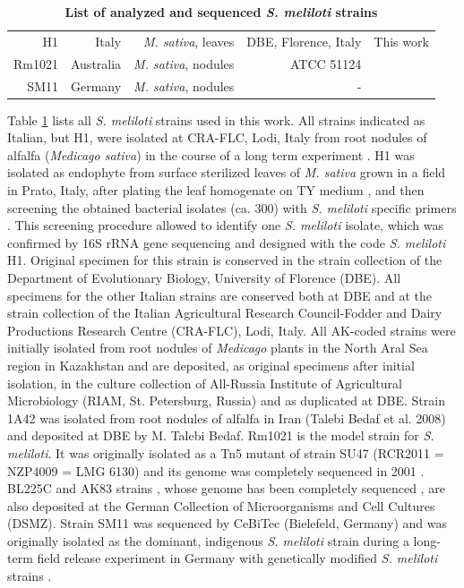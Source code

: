 \begin{small}
\begin{table}
\begin{tabular}{rrrrr}
    H1    & Italy & \textit{M. sativa}, leaves & DBE, Florence, Italy & This work \\
    Rm1021 & Australia & \textit{M. sativa}, nodules & ATCC 51124  & \cite{meade1982physical} \\
    SM11  & Germany & \textit{M. sativa}, nodules & -     & \cite{stiens2008comparative} \\
    \bottomrule
    \end{tabular}%
  \caption{\textbf{List of analyzed and sequenced \textit{S. meliloti} strains}}
  \label{tab:melilotistrains}%
\end{table}%

Table \ref{tab:melilotistrains} lists all \textit{S. meliloti} strains used in this work. All strains indicated as Italian, but H1, were isolated at CRA-FLC, Lodi, Italy from root nodules of alfalfa (\textit{Medicago sativa})  in the course of a long term experiment \cite{carelli2000genetic}. H1 was isolated as endophyte from surface sterilized leaves of  \textit{M. sativa} grown in a field in Prato, Italy, after plating the leaf  homogenate on TY medium \cite{beringer1974r}, and then screening the obtained bacterial isolates (ca. 300) with \textit{S. meliloti} specific primers \cite{trabelsi2009development}. This screening procedure allowed to identify one \textit{S. meliloti} isolate, which was confirmed by 16S rRNA gene sequencing and designed with the code \textit{S. meliloti} H1. Original specimen for this strain is conserved in the strain collection of the Department of Evolutionary Biology, University of Florence (DBE). All specimens for the other Italian strains are conserved both at DBE and at the strain collection of the Italian Agricultural Research Council-Fodder and Dairy Productions Research Centre (CRA-FLC), Lodi, Italy. All AK-coded strains were initially isolated from root nodules of \textit{Medicago} plants in the North Aral Sea region in Kazakhstan and are deposited, as original specimens after initial isolation, in the culture collection of All-Russia Institute of Agricultural Microbiology (RIAM, St. Petersburg, Russia) and as duplicated at DBE. Strain 1A42 was isolated from root nodules of alfalfa in Iran (Talebi Bedaf et al. 2008) and deposited at DBE by M. Talebi Bedaf. Rm1021 is the model strain for \textit{S. meliloti}. It was originally isolated as a Tn5 mutant of strain SU47 (RCR2011 = NZP4009 = LMG 6130) \cite{meade1982physical} and its genome was completely sequenced in 2001 \cite{galibert2001composite}. BL225C and AK83 strains \cite{giuntini2005large}, whose genome has been completely sequenced \cite{galardini2011exploring}, are also deposited at the German Collection of Microorganisms and Cell Cultures (DSMZ). Strain SM11 was sequenced by CeBiTec (Bielefeld, Germany) and was originally isolated as the dominant, indigenous \textit{S. meliloti} strain during a long-term field release experiment in Germany with genetically modified \textit{S. meliloti} strains \cite{schneiker2011complete}. 


\end{small}
